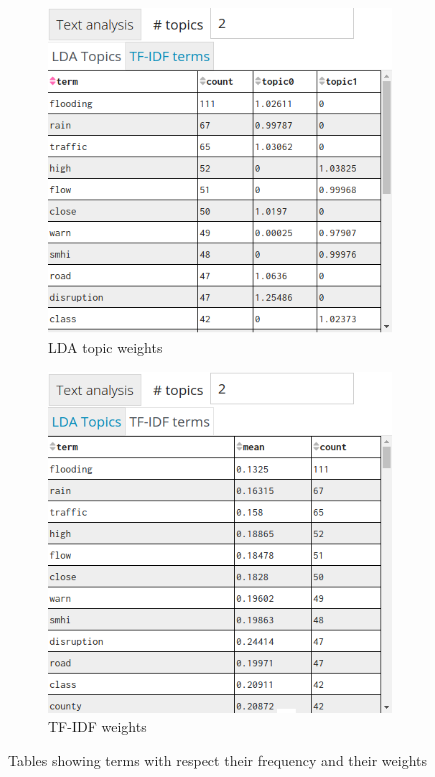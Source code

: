 \begin{figure}[H]
    \centering
    \begin{subfigure}[b]{0.45\textwidth}
        \centering
        \includegraphics[width=\textwidth]{./images/lda_topics.png}
        \caption{\ac{LDA} topic weights}
        \label{fig:lda_table}
    \end{subfigure}
    \hfill
    \begin{subfigure}[b]{0.45\textwidth}
        \centering
        \includegraphics[width=\textwidth, trim={0 0.5cm 0 0},clip]{./images/tf_idf.png}
        \caption{\ac{TF-IDF} weights}
        \label{fig:tfidf_table}
    \end{subfigure}
    \caption{Tables showing terms with respect their frequency and their weights}
    \label{fig:tables_lda_tfidf}
\end{figure}
